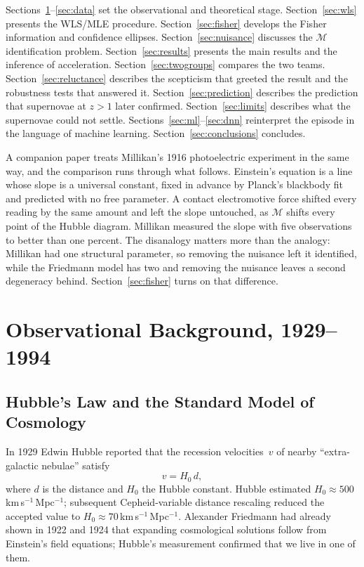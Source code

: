 \documentclass[12pt]{article}
\begin{document}
Sections~\ref{sec:background}--\ref{sec:data} set the observational and
theoretical stage.
Section~\ref{sec:wls} presents the WLS/MLE procedure.
Section~\ref{sec:fisher} develops the Fisher information and confidence
ellipses.
Section~\ref{sec:nuisance} discusses the $\mathcal{M}$ identification
problem.
Section~\ref{sec:results} presents the main results and the inference
of acceleration.
Section~\ref{sec:twogroups} compares the two teams.
Section~\ref{sec:reluctance} describes the scepticism that greeted the
result and the robustness tests that answered it.
Section~\ref{sec:prediction} describes the prediction that supernovae at
$z > 1$ later confirmed.
Section~\ref{sec:limits} describes what the supernovae could not settle.
Sections~\ref{sec:ml}--\ref{sec:dnn} reinterpret the episode in the
language of machine learning.
Section~\ref{sec:conclusions} concludes.

A companion paper treats Millikan's 1916 photoelectric experiment in the same
way, and the comparison runs through what follows.  Einstein's equation is a
line whose slope is a universal constant, fixed in advance by Planck's
blackbody fit and predicted with no free parameter.  A contact electromotive
force shifted every reading by the same amount and left the slope untouched,
as $\mathcal{M}$ shifts every point of the Hubble diagram.  Millikan measured
the slope with five observations to better than one percent.  The disanalogy
matters more than the analogy: Millikan had one structural parameter, so
removing the nuisance left it identified, while the Friedmann model has two
and removing the nuisance leaves a second degeneracy behind.
Section~\ref{sec:fisher} turns on that difference.

\section{Observational Background, 1929--1994}
\label{sec:background}

\subsection{Hubble's Law and the Standard Model of Cosmology}

In 1929 Edwin Hubble \citeyearpar{Hubble1929} reported that the
recession velocities~$v$ of nearby ``extra-galactic nebulae'' satisfy
\begin{equation}\label{eq:hubble}
  v = H_0\,d,
\end{equation}
where $d$ is the distance and $H_0$ the Hubble constant.  Hubble
estimated $H_0 \approx 500$\,km\,s$^{-1}$\,Mpc$^{-1}$; subsequent
Cepheid-variable distance rescaling reduced the accepted value to
$H_0 \approx 70$\,km\,s$^{-1}$\,Mpc$^{-1}$.  Alexander Friedmann had
already shown in 1922 and 1924 \citep{Friedmann1922,Friedmann1924} that
expanding cosmological solutions follow from Einstein's field equations;
Hubble's measurement confirmed that we live in one of them.
\end{document}
